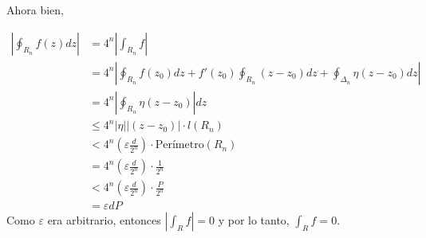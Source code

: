 \begin{dem}
        Ahora bien, 

        \begin{align*}
            \left|\oint_{R_n}f(z)dz\right|&=4^n\left|\int_{R_n}f\right|\\
            &= 4^n\left|\oint_{R_n}f(z_0)dz+f'(z_0)\oint_{R_n}(z-z_0)dz+\oint_{\Delta_n}\eta(z-z_0)dz\right|\\
            &= 4^n\left|\oint_{R_n}\eta(z-z_0)\right|dz\\
            &\leq 4^n\left|\eta\right|\left|(z-z_0)\right|\cdot l(R_n)\\
            &< 4^n\left(\varepsilon\frac{d}{2^n}\right)\cdot \text{Perímetro}(R_n)\\
            &= 4^n\left(\varepsilon\frac{d}{2^n}\right)\cdot \frac{1}{2^n}\\
            &< 4^n\left(\varepsilon\frac{d}{2^n}\right)\cdot \frac{P}{2^n}\\
            &= \varepsilon dP 
        \end{align*}
        Como $\varepsilon$ era arbitrario, entonces $\left|\int_R f\right|=0$ y por lo tanto, $\int_R f =0$.
    
\end{dem}

%
%

